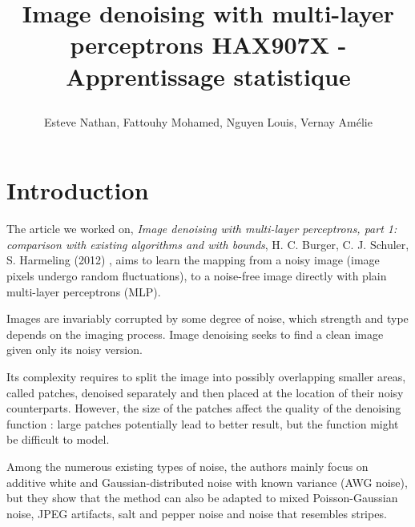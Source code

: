 \documentclass[10pt,a4paper]{article}
\author{Esteve Nathan, Fattouhy Mohamed, Nguyen Louis, Vernay Amélie}
\title{%
    \begin{minipage}\linewidth
        \centering
        Image denoising with multi-layer perceptrons
        \vskip3pt
        \large 
        HAX907X - Apprentissage statistique
    \end{minipage}
}
\newcommand{\svs}{\vspace{9pt}}
\begin{document}
\maketitle
\section{Introduction}

The article we worked on, \emph{Image denoising with multi-layer perceptrons, part 1: comparison with existing algorithms and with bounds}, H. C. Burger, C. J. Schuler, S. Harmeling (2012) \citep{denoise}, aims to learn the mapping from a noisy image (image pixels undergo random fluctuations), to a noise-free image directly with plain multi-layer perceptrons (MLP).

\svs

Images are invariably corrupted by some degree of noise, which strength and type depends on the imaging process. Image denoising seeks to find a clean image given only its noisy version.

\svs

Its complexity requires to split the image into possibly overlapping smaller areas, called patches, denoised separately and then placed at the location of their noisy counterparts. However, the size of the patches affect the quality of the denoising function : large patches potentially lead to better result, but the function might be difficult to model.

\svs

Among the numerous existing types of noise, the authors mainly focus on additive white and Gaussian-distributed noise with known variance (AWG noise), but they show that the method can also be adapted to mixed Poisson-Gaussian noise, JPEG artifacts, salt and pepper noise and noise that resembles stripes.

\svs



\end{document}
